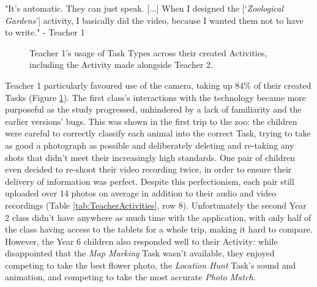 \begin{displayquote}
"It’s automatic. They can just speak. [...] When I designed the [‘\textit{Zoological Gardens}’] activity, I basically did the video, because I wanted them not to have to write." - Teacher 1
\end{displayquote}

\begin{figure}
    \centering
    \caption[Teacher 1's usage of Task Types across their created Activities]{Teacher 1's usage of Task Types across their created Activities, including the Activity made alongside Teacher 2.}
    \label{fig:TaskTypeUsage}
\end{figure}

Teacher 1 particularly favoured use of the camera, taking up 84\% of their created Tasks (Figure \ref{fig:TaskTypeUsage}). The first class's interactions with the technology became more purposeful as the study progressed, unhindered by a lack of familiarity and the earlier versions' bugs. This was shown in the first trip to the zoo: the children were careful to correctly classify each animal into the correct Task, trying to take as good a photograph as possible and deliberately deleting and re-taking any shots that didn't meet their increasingly high standards. One pair of children even decided to re-shoot their video recording twice, in order to ensure their delivery of information was perfect. Despite this perfectionism, each pair still uploaded over 14 photos on average in addition to their audio and video recordings (Table \ref{tab:TeacherActivities}, row 8). Unfortunately the second Year 2 class didn't have anywhere as much time with the application, with only half of the class having access to the tablets for a whole trip, making it hard to compare. However, the Year 6 children also responded well to their Activity: while disappointed that the \textit{Map Marking} Task wasn't available, they enjoyed competing to take the best flower photo, the \textit{Location Hunt} Task’s sound and animation, and competing to take the most accurate \textit{Photo Match}.

